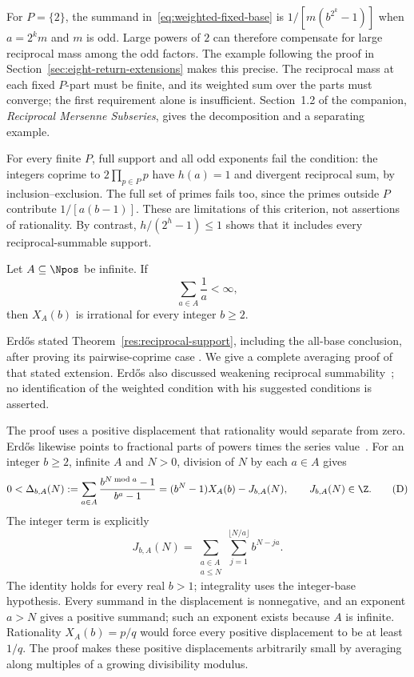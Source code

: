 \documentclass[11pt]{article}
\begin{document}
For $P=\{2\}$, the summand in~\eqref{eq:weighted-fixed-base} is
$1/[m(b^{2^k}-1)]$ when $a=2^km$ and $m$ is odd.  Large powers of $2$
can therefore compensate for large reciprocal mass among the odd
factors.  The example following the proof in
Section~\ref{sec:eight-return-extensions} makes this precise.
The reciprocal mass at each fixed $P$-part must be finite, and its
weighted sum over the parts must converge; the first requirement alone
is insufficient.  Section~1.2 of the companion, \emph{Reciprocal Mersenne
Subseries}, gives the decomposition and a separating example.

For every finite $P$, full support and all odd exponents fail the
condition: the integers coprime to $2\prod_{p\in P}p$ have $h(a)=1$
and divergent reciprocal sum, by inclusion--exclusion.  The full set
of primes fails too, since the primes outside $P$ contribute
$1/[a(b-1)]$.  These are limitations of this criterion, not assertions
of rationality.  By contrast, $h/(2^h-1)\le1$ shows that it includes
every reciprocal-summable support.

\begin{theorem}\label{res:reciprocal-support}
Let $A\subseteq\Npos$ be infinite.  If
\[
  \sum_{a\in A}\frac1a<\infty,
\]
then \(X_A(b)\) is irrational for every integer \(b\ge2\).
\end{theorem}

Erd\H{o}s stated Theorem~\ref{res:reciprocal-support}, including the
all-base conclusion, after proving its pairwise-coprime case
\cite[p.~222]{erdos1968}.  We give a complete averaging proof of that stated extension.  Erd\H{o}s also discussed weakening reciprocal
summability~\cite[pp.~222, 226]{erdos1968}; no identification of the
weighted condition with his suggested conditions is asserted.

The proof uses a positive displacement that rationality would separate
from zero.  Erd\H{o}s likewise points to fractional parts of powers times
the series value~\cite[p.~226]{erdos1968}.
For an integer $b\ge2$, infinite $A$ and $N>0$, division of $N$ by
each $a\in A$ gives
\[
 0<\Delta_{b,A}(N)
 :=\sum_{a\in A}\frac{b^{N\bmod a}-1}{b^a-1}
 =(b^N-1)X_A(b)-J_{b,A}(N),\qquad J_{b,A}(N)\in\Z.
 \label{eq:intro-displacement}\tag{D}
\]
The integer term is explicitly
\[
 J_{b,A}(N)=\sum_{\substack{a\in A\\a\le N}}
             \sum_{j=1}^{\lfloor N/a\rfloor}b^{N-ja}.
\]
The identity holds for every real $b>1$; integrality uses the integer-base
hypothesis.  Every summand in the displacement
is nonnegative, and an exponent $a>N$ gives a positive summand; such an
exponent exists because $A$ is infinite. Rationality $X_A(b)=p/q$
would force every positive displacement to be at least $1/q$.
The proof makes these positive displacements arbitrarily small by
averaging along multiples of a growing divisibility modulus.
\end{document}
